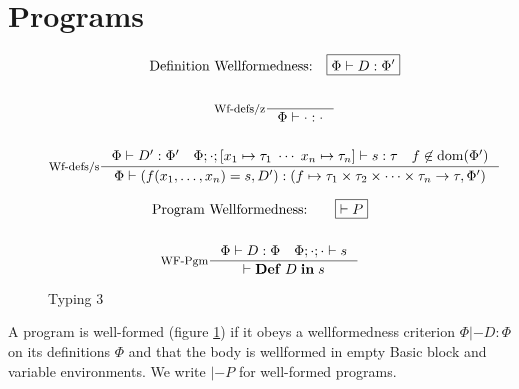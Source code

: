 \documentclass[a4paper, oneside, 10pt, draft]{memoir}
\begin{document}
\section{Programs}
\newcommand{\dom}[1]{\mathrm{dom}(#1)}
\begin{figure}
  \begin{gather*}
    \text{Definition Wellformedness:} \quad \boxed{\Phi |- D : \Phi'}\\\\
    \inference[Wf-defs/z]{}{\Phi |- \cdot : \cdot}\\\\
    \inference[Wf-defs/s]{\Phi |- D' : \Phi' \quad \Phi;\cdot;[x_1 \mapsto
      \tau_1 \; \dotsb \; x_n \mapsto \tau_n] |- s :
      \tau \quad f \not \in \dom{\Phi'}}{\Phi |- (f(x_1, \dotsc, x_n) = s, D') : (f \mapsto \ntypes -> \tau, \Phi')}
  \end{gather*}

  \begin{gather*}
    \text{Program Wellformedness:} \quad \quad \boxed{|- P}\\\\
    \inference[WF-Pgm]{\Phi |- D : \Phi \quad \Phi;\cdot;\cdot |- s}{|- \ipgm{D}{s}}
  \end{gather*}
  \caption{Typing 3}
  \label{fig:type-judgement-3}
\end{figure}

A program is well-formed (figure \ref{fig:type-judgement-3}) if it
obeys a wellformedness criterion $\boxed{\Phi |- D : \Phi}$ on its
definitions $\Phi$ and that the body is wellformed in empty Basic
block and variable environments. We write $\boxed{|- P}$ for
well-formed programs.
\end{document}
